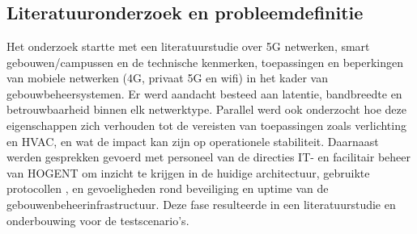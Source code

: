
\chapter{}%
\label{ch:methodologie}


\section{Literatuuronderzoek en probleemdefinitie}

Het onderzoek startte met een literatuurstudie over 5G netwerken, smart gebouwen/campussen en de technische kenmerken, toepassingen en beperkingen van mobiele netwerken (4G, privaat 5G en wifi) in het kader van gebouwbeheersystemen. Er werd aandacht besteed aan latentie, bandbreedte en betrouwbaarheid binnen elk netwerktype. Parallel werd ook onderzocht hoe deze eigenschappen zich verhouden tot de vereisten van toepassingen zoals verlichting en HVAC, en wat de impact kan zijn op operationele stabiliteit.
Daarnaast werden gesprekken gevoerd met personeel van de directies IT- en facilitair beheer van HOGENT om inzicht te krijgen in de huidige architectuur, gebruikte protocollen , en gevoeligheden rond beveiliging en uptime van de gebouwenbeheerinfrastructuur. Deze fase resulteerde in een literatuurstudie en onderbouwing voor de testscenario’s.


